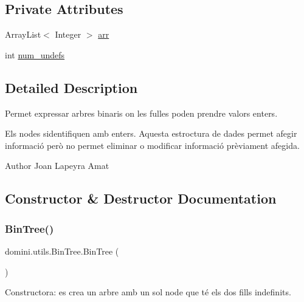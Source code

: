 \subsection*{Private Attributes}
\begin{DoxyCompactItemize}
\item 
Array\+List$<$ Integer $>$ \hyperlink{classdomini_1_1utils_1_1BinTree_a357bcbcf07ba7fcb99d11b237d189e65}{arr}
\item 
int \hyperlink{classdomini_1_1utils_1_1BinTree_a36f1212262c353accbc0a0385fa45a8d}{num\+\_\+undefs}
\end{DoxyCompactItemize}


\subsection{Detailed Description}
Permet expressar arbres binaris on les fulles poden prendre valors enters. 

Els nodes s\textquotesingle{}identifiquen amb enters. Aquesta estroctura de dades permet afegir informació però no permet eliminar o modificar informació prèviament afegida.

\begin{DoxyAuthor}{Author}
Joan Lapeyra Amat 
\end{DoxyAuthor}


\subsection{Constructor \& Destructor Documentation}
\mbox{\label{classdomini_1_1utils_1_1BinTree_a46082da82a1186c5a99ae68eee6ece13}} 
\subsubsection{\texorpdfstring{Bin\+Tree()}{BinTree()}\hspace{0.1cm}{\footnotesize\ttfamily [1/2]}}
{\footnotesize\ttfamily domini.\+utils.\+Bin\+Tree.\+Bin\+Tree (\begin{DoxyParamCaption}{ }\end{DoxyParamCaption})\hspace{0.3cm}{\ttfamily [inline]}}



Constructora\+: es crea un arbre amb un sol node que té els dos fills indefinits. 

